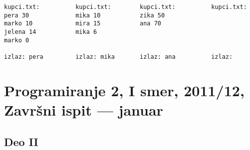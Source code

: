 \begin{enumerate}
\begin{verbatim}
kupci.txt:          kupci.txt:        kupci.txt:          kupci.txt:
pera 30             mika 10           zika 50
marko 10            mira 15           ana 70
jelena 14           mika 6
marko 0

izlaz: pera         izlaz: mika       izlaz: ana          izlaz:
\end{verbatim}
\end{enumerate}


\section{Programiranje 2, I smer, 2011/12, Zavr\v{s}ni ispit --- januar}

\subsection{Deo II}

